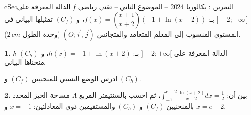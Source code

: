 \documentclass[12pt,a4paper]{article}
\newenvironment{BOX}[2]{\begin{otherlanguage}{english}\begin{arbox}{#1}{#2}}{\end{arbox}\end{otherlanguage}}
\newcounter{exo}
\newenvironment{tamrin}[1]{\stepcounter{exo}\begin{BOX}{cSec}{التمرين \theexo: #1}}{\end{BOX}}
\newcommand{\QQ}[1]{\par\smallskip\textbf{#1.} }
\begin{document}
\begin{tamrin}{بكالوريا 2024 -- الموضوع الثاني -- تقني رياضي}
$f$ الدالة المعرفة على $]-2;+\infty[$ بـ: $f(x)=\left(\dfrac{x+1}{x+2}\right)\left(-1+\ln(x+2)\right)$، و $(C_f)$ تمثيلها البياني في المستوي المنسوب إلى المعلم المتعامد والمتجانس $(O;\vec{i},\vec{j})$ (وحدة الطول $2\,cm$).

\QQ{1} $h$ الدالة المعرفة على $]-2;+\infty[$ بـ: $h(x)=-1+\ln(x+2)$، و $(C_h)$ منحناها البياني.

ادرس الوضع النسبي للمنحنيين $(C_f)$ و $(C_h)$.

\QQ{2} بين أن: $\displaystyle\int_{-1}^{e-2}\frac{\ln(x+2)}{x+2}dx=\frac12$، ثم احسب بالسنتيمتر المربع $A$ مساحة الحيز المحدد بالمنحنيين $(C_f)$ و $(C_h)$ والمستقيمين ذوي المعادلتين: $x=-1$ و $x=e-2$.
\end{tamrin}
\end{document}
